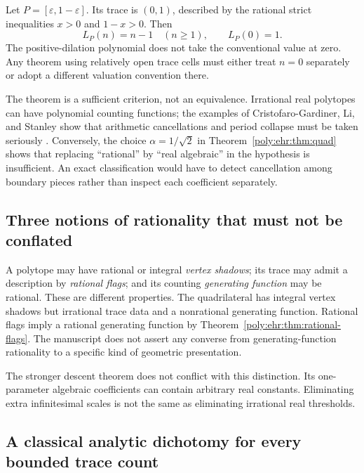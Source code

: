 \documentclass[11pt,a4paper]{article}
\numberwithin{equation}{section}
\theoremstyle{plain}
\newcommand{\eps}{\varepsilon}
\begin{document}
\begin{example}[Why $n=0$ needs a convention]
Let $P=[\eps,1-\eps]$. Its trace is $(0,1)$, described by the rational
strict inequalities $x>0$ and $1-x>0$. Then
\[
 L_P(n)=n-1\quad(n\geq1),\qquad L_P(0)=1.
\]
The positive-dilation polynomial does not take the conventional value at
zero. Any theorem using relatively open trace cells must either treat
$n=0$ separately or adopt a different valuation convention there.
\end{example}

\begin{remark}
The theorem is a sufficient criterion, not an equivalence. Irrational
real polytopes can have polynomial counting functions; the examples of
Cristofaro-Gardiner, Li, and Stanley show that arithmetic cancellations
and period collapse must be taken seriously \cite{ehr:cgls}. Conversely, the
choice $\alpha=1/\sqrt2$ in Theorem~\ref{poly:ehr:thm:quad} shows that replacing
``rational'' by ``real algebraic'' in the hypothesis is insufficient.
An exact classification would have to detect cancellation among boundary
pieces rather than inspect each coefficient separately.
\end{remark}

\subsection{Three notions of rationality that must not be conflated}

A polytope may have rational or integral \emph{vertex shadows}; its trace
may admit a description by \emph{rational flags}; and its counting
\emph{generating function} may be rational. These are different properties.
The quadrilateral has integral vertex shadows but irrational trace data and
a nonrational generating function. Rational flags imply a rational
generating function by Theorem~\ref{poly:ehr:thm:rational-flags}. The manuscript
does not assert any converse from generating-function rationality to a
specific kind of geometric presentation.

The stronger descent theorem does not conflict with this distinction.
Its one-parameter algebraic coefficients can contain arbitrary real
constants. Eliminating extra infinitesimal scales is not the same as
eliminating irrational real thresholds.

\subsection{A classical analytic dichotomy for every bounded trace count}
\end{document}
